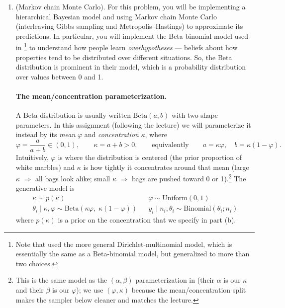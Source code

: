 \documentclass[11pt]{article}
\begin{document}
\begin{enumerate}
\begin{enumerate}
\item Write a few sentences comparing Figures 1a and 1b: How and why do they differ? What is a broad lesson about Monte Carlo approximation that we can learn from this comparison?
\end{enumerate}

\item (Markov chain Monte Carlo). For this problem, you will be implementing a hierarchical Bayesian model and using Markov chain Monte Carlo (interleaving Gibbs sampling and Metropolis--Hastings) to approximate its predictions. In particular, you will implement the Beta-binomial model used in \citet*{kemp07}\footnote{Note that \citet*{kemp07} used the more general Dirichlet-multinomial model, which is essentially the same as a Beta-binomial model, but generalized to more than two choices.} to understand how people learn {\em overhypotheses} --- beliefs about how properties tend to be distributed over different situations. So, the Beta distribution is prominent in their model, which is a probability distribution over values between 0 and 1.

\paragraph{The mean/concentration parameterization.} A Beta distribution is usually written $\mathrm{Beta}(a,b)$ with two shape parameters. In this assignment (following the lecture) we will parameterize it instead by its {\em mean} $\varphi$ and {\em concentration} $\kappa$, where
\begin{equation*}
\varphi = \frac{a}{a+b} \in (0,1), \qquad \kappa = a + b > 0,
\qquad\text{equivalently}\qquad a = \kappa\varphi, \quad b = \kappa(1-\varphi).
\end{equation*}
Intuitively, $\varphi$ is where the distribution is centered (the prior proportion of white marbles) and $\kappa$ is how tightly it concentrates around that mean (large $\kappa$ $\Rightarrow$ all bags look alike; small $\kappa$ $\Rightarrow$ bags are pushed toward 0 or 1).\footnote{This is the same model as the $(\alpha,\beta)$ parameterization in \citet*{kemp07} (their $\alpha$ is our $\kappa$ and their $\beta$ is our $\varphi$); we use $(\varphi,\kappa)$ because the mean/concentration split makes the sampler below cleaner and matches the lecture.} The generative model is
\begin{align*}
\kappa \sim p(\kappa) & & \varphi \sim \mathrm{Uniform}(0,1) \\
 \theta_i \mid \kappa, \varphi \sim \mathrm{Beta}\left(\kappa\varphi,\; \kappa(1-\varphi)\right) & & y_i \mid n_i, \theta_i \sim \mathrm{Binomial}(\theta_i; n_i)
\end{align*}
where $p(\kappa)$ is a prior on the concentration that we specify in part (b).


\end{enumerate}
\end{document}
